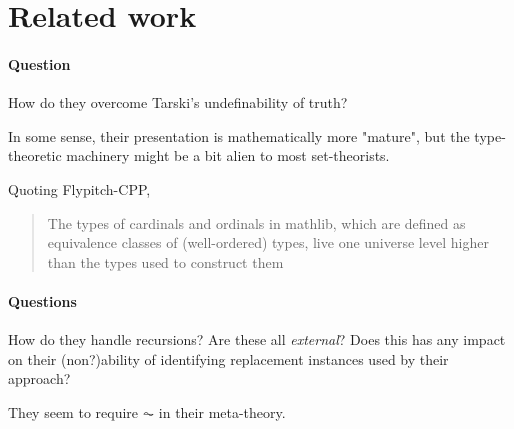 \section{Related work}
\label{sec:related-work}

\paragraph*{Question} How do they overcome Tarski's undefinability of truth?

In some sense, their presentation is mathematically more "mature",
but the type-theoretic machinery might be a bit alien to most
set-theorists.

Quoting Flypitch-CPP,
\begin{quote}
  The types of cardinals and ordinals in mathlib, which
  are defined as equivalence classes of (well-ordered) types, live one
  universe level higher than the types used to construct them
\end{quote}

\paragraph*{Questions} How do they handle recursions? Are these all
\emph{external}? Does this has any impact on their (non?)ability of
identifying replacement instances used by their approach?

They seem to require $\AC$ in their meta-theory.

